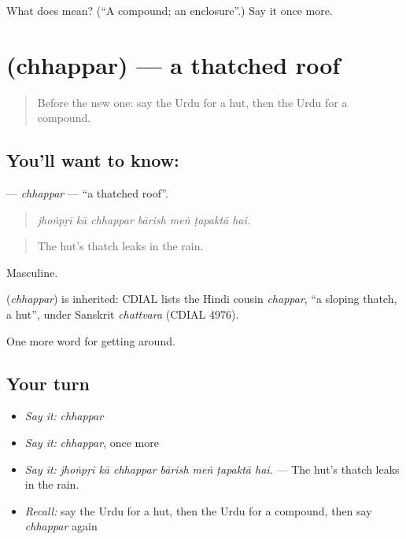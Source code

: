 \begin{tcolorbox}[breakable,colback=teal!4,colframe=teal!35!black,title={Before you move on}]
What does  mean? (\textquotedblleft{}A compound; an enclosure\textquotedblright{}.) Say it once more.
\end{tcolorbox}
\section[\texorpdfstring{\ur{چھپر} (chhappar)}{چھپر (chhappar)}]{ (chhappar) — a thatched roof}

\label{lesson:UR-C413-chhappar}



\begin{quote}
Before the new one: say the Urdu for a hut, then the Urdu for a compound.
\end{quote}

\subsection*{You'll want to know: }
\textbf{} — \emph{chhappar} — \textquotedblleft{}a thatched roof\textquotedblright{}.

\begin{quote}
      
\end{quote}

\begin{quote}
\emph{jhoṅpṛī kā chhappar bārish meṅ ṭapaktā hai.}
\end{quote}

\begin{quote}
The hut's thatch leaks in the rain.
\end{quote}

Masculine.

\begin{cousinweb}
\textbf{} (\emph{chhappar}) is inherited: CDIAL lists the Hindi cousin \emph{chappar}, \textquotedblleft{}a sloping thatch, a hut\textquotedblright{}, under Sanskrit \emph{chattvara} (CDIAL 4976).
\end{cousinweb}

\begin{grammarlens}[title={What you've built}]
One more word for getting around.
\end{grammarlens}

\subsection*{Your turn}
\begin{itemize}
\raggedright
  \item \emph{Say it:} \emph{chhappar}
  \item \emph{Say it:} \emph{chhappar}, once more
  \item \emph{Say it:} \emph{jhoṅpṛī kā chhappar bārish meṅ ṭapaktā hai.} — The hut's thatch leaks in the rain.
  \item \emph{Recall:} say the Urdu for a hut, then the Urdu for a compound, then say \emph{chhappar} again
\end{itemize}

